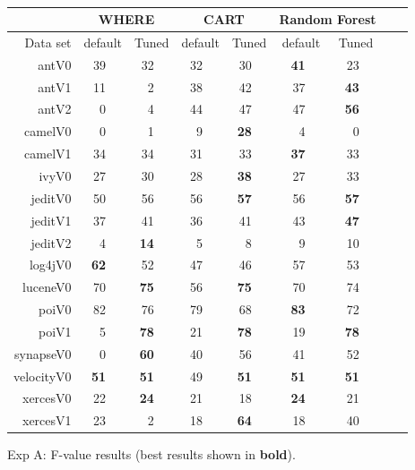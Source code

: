 \documentclass{acm_proc_article-sp}
\begin{document}
\begin{figure}[!t]
\renewcommand{\baselinestretch}{0.8} 

\scriptsize  
~~~\begin{tabular}{r|rl|rl|rl|rl|rl|rlrl}
      &   \multicolumn{4}{c|}{WHERE}         &   \multicolumn{4}{c|}{CART}         &   \multicolumn{4}{c}{Random Forest}         \\\hline
  Data set   &   \multicolumn{2}{c}{default}         &   \multicolumn{2}{c|}{Tuned}         &   \multicolumn{2}{c}{default}         &   \multicolumn{2}{c|}{Tuned}    &   \multicolumn{2}{c}{default}  &   \multicolumn{2}{c}{Tuned}\\\hline
antV0 & 39 &   & 32 &   & 32 &   & 30 &   & {\bf 41} &   & 23 &  \\
antV1 & 11 &   & 2 &   & 38 &   & 42 &   & 37 &   & {\bf 43} &  \\
antV2 & 0 &   & 4 &   & 44 &   & 47 &   & 47 &   & {\bf 56} &  \\
camelV0 & 0 &   & 1 &   & 9 &   & {\bf 28} &   & 4 &   & 0 &  \\
camelV1 & 34 &   & 34 &   & 31 &   & 33 &   & {\bf 37} &   & 33 &  \\
ivyV0 & 27 &   & 30 &   & 28 &   & {\bf 38} &   & 27 &   & 33 &  \\
jeditV0 & 50 &   & 56 &   & 56 &   & {\bf 57} &   & 56 &   & {\bf 57} &  \\
jeditV1 & 37 &   & 41 &   & 36 &   & 41 &   & 43 &   & {\bf 47} &  \\
jeditV2 & 4 &   & {\bf 14} &   & 5 &   & 8 &   & 9 &   & 10 &  \\
log4jV0 & {\bf 62} &   & 52 &   & 47 &   & 46 &   & 57 &   & 53 &  \\
luceneV0 & 70 &   & {\bf 75} &   & 56 &   & {\bf 75} &   & 70 &   & 74 &  \\
poiV0 & 82 &   & 76 &   & 79 &   & 68 &   & {\bf 83} &   & 72 &  \\
poiV1 & 5 &   & {\bf 78} &   & 21 &   & {\bf 78} &   & 19 &   & {\bf 78} &  \\
synapseV0 & 0 &   & {\bf 60} &   & 40 &   & 56 &   & 41 &   & 52 &  \\
velocityV0 & {\bf 51} &   & {\bf 51} &   & 49 &   & {\bf 51} &   & {\bf 51} &   & {\bf 51} &  \\
xercesV0 & 22 &   & {\bf 24} &   & 21 &   & 18 &   & {\bf 24} &   & 21 &  \\
xercesV1 & 23 &   & 2 &   & 18 &   & {\bf 64} &   & 18 &   & 40 &  \\

\end{tabular}
\caption{ Exp A: F-value results (best results  shown in {\bf bold}).}
\label{fig:fbars}
\end{figure}
\end{document}
